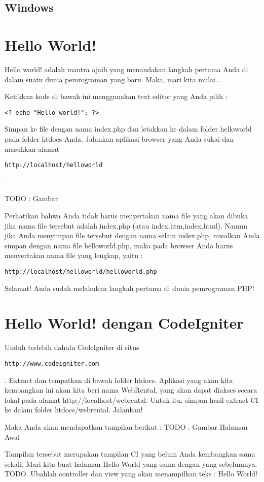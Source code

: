 \subsection{Windows}
\section{Hello World!}
Hello world! adalah mantra ajaib yang menandakan langkah pertama Anda di dalam suatu dunia pemrograman yang baru. Maka, mari kita mulai...

Ketikkan kode di bawah ini menggunakan text editor yang Anda pilih :
\begin{verbatim}
<? echo "Hello world!"; ?>
\end{verbatim}

Simpan ke file dengan nama index.php dan letakkan ke dalam folder helloworld pada folder htdocs Anda. Jalankan aplikasi browser yang Anda sukai dan masukkan alamat \begin{verbatim}http://localhost/helloworld\end{verbatim}. 

TODO : Gambar

Perhatikan bahwa Anda tidak harus menyertakan nama file yang akan dibuka jika nama file tersebut adalah index.php (atau index.htm,index.html). Namun jika Anda menyimpan file tersebut dengan nama selain index.php, misalkan Anda simpan dengan nama file helloworld.php, maka pada browser Anda harus menyertakan nama file yang lengkap, yaitu :

\begin{verbatim}http://localhost/helloworld/helloworld.php\end{verbatim}

Selamat! Anda sudah melakukan langkah pertama di dunia pemrograman PHP!
\section{Hello World! dengan CodeIgniter}
Unduh terlebih dahulu CodeIgniter di situs \begin{verbatim}http://www.codeigniter.com\end{verbatim}. Extract dan tempatkan di bawah folder htdocs. Aplikasi yang akan kita kembangkan ini akan kita beri nama WebRental, yang akan dapat diakses secara lokal pada alamat http://localhost/webrental. Untuk itu, simpan hasil extract CI ke dalam folder htdocs/webrental. Jalankan! 

Maka Anda akan mendapatkan tampilan berikut :
TODO : Gambar Halaman Awal

Tampilan tersebut merupakan tampilan CI yang belum Anda kembangkan sama sekali. Mari kita buat halaman Hello World yang sama dengan yang sebelumnya. TODO. Ubahlah controller dan view yang akan menampilkan teks : Hello World!